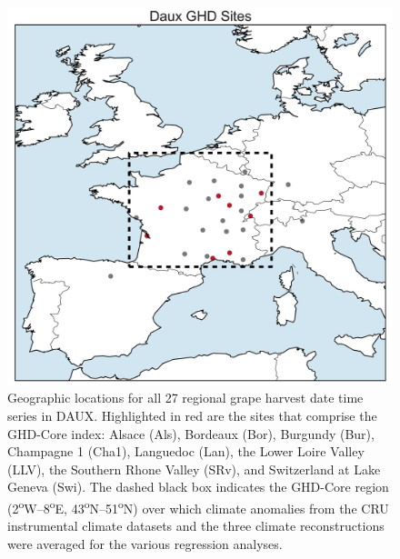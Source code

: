 \documentclass[12pt]{article}
\begin{document}
\pagebreak

\renewcommand{\figurename}{Supplementary Figure}
\setcounter{figure}{0}

\begin{figure}
\center
\includegraphics[width=1.0\columnwidth,scale=2]{SUPP_fig_01_map_sites.png}
\caption{Geographic locations for all 27 regional grape harvest date time series in DAUX. Highlighted in red are the sites that comprise the GHD-Core index: Alsace (Als), Bordeaux (Bor), Burgundy (Bur), Champagne 1 (Cha1), Languedoc (Lan), the Lower Loire Valley (LLV), the Southern Rhone Valley (SRv), and Switzerland at Lake Geneva (Swi). The dashed black box indicates the GHD-Core region (2\textsuperscript{o}W--8\textsuperscript{o}E, 43\textsuperscript{o}N--51\textsuperscript{o}N) over which climate anomalies from the CRU instrumental climate datasets and the three climate reconstructions were averaged for the various regression analyses.}
\end{figure}
\end{document}
